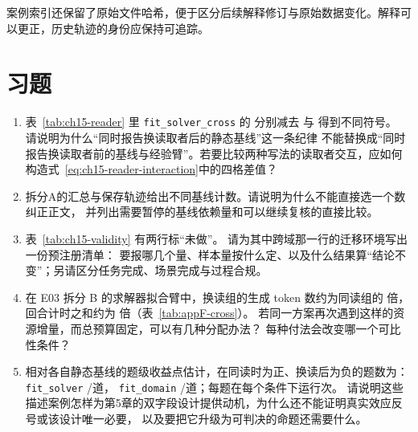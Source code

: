 

案例索引还保留了原始文件哈希，便于区分后续解释修订与原始数据变化。解释可以更正，历史轨迹的身份应保持可追踪。

\section*{习题}
\begin{enumerate}[label=15-\arabic*.,ref=15-\arabic*]
  \item\label{ex:ch15-1} 表~\ref{tab:ch15-reader} 里 \texttt{fit\_solver\_cross} 的 
        分别减去  与  得到不同符号。
        请说明为什么“同时报告换读取者后的静态基线”这一条纪律
        不能替换成“同时报告换读取者前的基线与经验臂”。若要比较两种写法的读取者交互，应如何构造式~\ref{eq:ch15-reader-interaction}中的四格差值？
  \item\label{ex:ch15-2} 拆分A的汇总与保存轨迹给出不同基线计数。请说明为什么不能直接选一个数纠正正文，
        并列出需要暂停的基线依赖量和可以继续复核的直接比较。
  \item\label{ex:ch15-3} 表~\ref{tab:ch15-validity} 有两行标“未做”。
        请为其中跨域那一行的迁移环境写出一份预注册清单：
        要报哪几个量、样本量按什么定、以及什么结果算“结论不变”；另请区分任务完成、场景完成与过程合规。
  \item\label{ex:ch15-4} 在 E03 拆分 B 的求解器拟合臂中，换读组的生成 token 数约为同读组的  倍，回合计时之和约为  倍（表~\ref{tab:appF-cross}）。
        若同一方案再次遇到这样的资源增量，而总预算固定，可以有几种分配办法？
        每种付法会改变哪一个可比性条件？
  \item\label{ex:ch15-5} 相对各自静态基线的题级收益点估计，在同读时为正、换读后为负的题数为：\texttt{fit\_solver} /道，
        \texttt{fit\_domain} /道；每题在每个条件下运行次。
        请说明这些描述案例怎样为第5章的双字段设计提供动机，为什么还不能证明真实效应反号或该设计唯一必要，
        以及要把它升级为可判决的命题还需要什么。
\end{enumerate}

